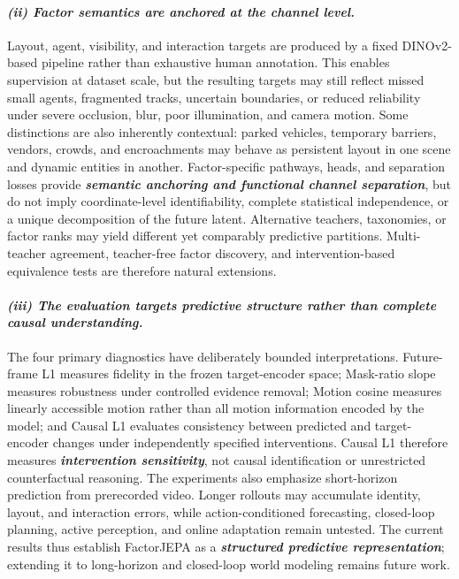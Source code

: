 \paragraph{\textbf{\emph{(ii) Factor semantics are anchored at the channel level.}}} Layout, agent, visibility, and interaction targets are produced by a fixed DINOv2-based pipeline rather than exhaustive human annotation. This enables supervision at dataset scale, but the resulting targets may still reflect missed small agents, fragmented tracks, uncertain boundaries, or reduced reliability under severe occlusion, blur, poor illumination, and camera motion. Some distinctions are also inherently contextual: parked vehicles, temporary barriers, vendors, crowds, and encroachments may behave as persistent layout in one scene and dynamic entities in another. Factor-specific pathways, heads, and separation losses provide \textbf{\emph{semantic anchoring and functional channel separation}}, but do not imply coordinate-level identifiability, complete statistical independence, or a unique decomposition of the future latent. Alternative teachers, taxonomies, or factor ranks may yield different yet comparably predictive partitions. Multi-teacher agreement, teacher-free factor discovery, and intervention-based equivalence tests are therefore natural extensions.

\paragraph{\textbf{\emph{(iii) The evaluation targets predictive structure rather than complete causal understanding.}}} The four primary diagnostics have deliberately bounded interpretations. Future-frame L1 measures fidelity in the frozen target-encoder space; Mask-ratio slope measures robustness under controlled evidence removal; Motion cosine measures linearly accessible motion rather than all motion information encoded by the model; and Causal L1 evaluates consistency between predicted and target-encoder changes under independently specified interventions. Causal L1 therefore measures \textbf{\emph{intervention sensitivity}}, not causal identification or unrestricted counterfactual reasoning. The experiments also emphasize short-horizon prediction from prerecorded video. Longer rollouts may accumulate identity, layout, and interaction errors, while action-conditioned forecasting, closed-loop planning, active perception, and online adaptation remain untested. The current results thus establish FactorJEPA as a \textbf{\emph{structured predictive representation}}; extending it to long-horizon and closed-loop world modeling remains future work.

